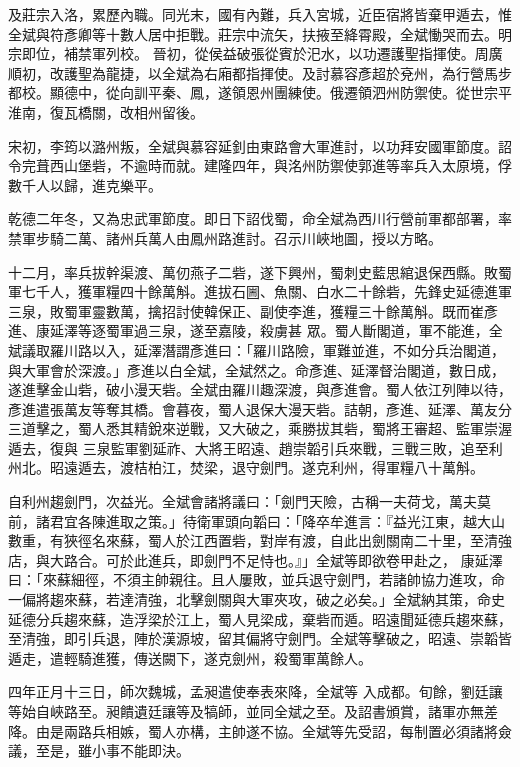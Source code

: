 \begin{pinyinscope}
 及莊宗入洛，累歷內職。同光末，國有內難，兵入宮城，近臣宿將皆棄甲遁去，惟全斌與符彥卿等十數人居中拒戰。莊宗中流矢，扶掖至絳霄殿，全斌慟哭而去。明宗即位，補禁軍列校。
 晉初，從侯益破張從賓於汜水，以功遷護聖指揮使。周廣順初，改護聖為龍捷，以全斌為右廂都指揮使。及討慕容彥超於兗州，為行營馬步都校。顯德中，從向訓平秦、鳳，遂領恩州團練使。俄遷領泗州防禦使。從世宗平淮南，復瓦橋關，改相州留後。



 宋初，李筠以潞州叛，全斌與慕容延釗由東路會大軍進討，以功拜安國軍節度。詔令完葺西山堡砦，不逾時而就。建隆四年，與洺州防禦使郭進等率兵入太原境，俘數千人以歸，進克樂平。



 乾德二年冬，又為忠武軍節度。即日下詔伐蜀，命全斌為西川行營前軍都部署，率禁軍步騎二萬、諸州兵萬人由鳳州路進討。召示川峽地圖，授以方略。



 十二月，率兵拔幹渠渡、萬仞燕子二砦，遂下興州，蜀刺史藍思綰退保西縣。敗蜀軍七千人，獲軍糧四十餘萬斛。進拔石圌、魚關、白水二十餘砦，先鋒史延德進軍三泉，敗蜀軍靈數萬，擒招討使韓保正、副使李進，獲糧三十餘萬斛。既而崔彥進、康延澤等逐蜀軍過三泉，遂至嘉陵，殺虜甚
 眾。蜀人斷閣道，軍不能進，全斌議取羅川路以入，延澤潛謂彥進曰：「羅川路險，軍難並進，不如分兵治閣道，與大軍會於深渡。」彥進以白全斌，全斌然之。命彥進、延澤督治閣道，數日成，遂進擊金山砦，破小漫天砦。全斌由羅川趣深渡，與彥進會。蜀人依江列陣以待，彥進遣張萬友等奪其橋。會暮夜，蜀人退保大漫天砦。詰朝，彥進、延澤、萬友分三道擊之，蜀人悉其精銳來逆戰，又大破之，乘勝拔其砦，蜀將王審超、監軍崇渥遁去，復與
 三泉監軍劉延祚、大將王昭遠、趙崇韜引兵來戰，三戰三敗，追至利州北。昭遠遁去，渡桔柏江，焚梁，退守劍門。遂克利州，得軍糧八十萬斛。



 自利州趨劍門，次益光。全斌會諸將議曰：「劍門天險，古稱一夫荷戈，萬夫莫前，諸君宜各陳進取之策。」待衛軍頭向韜曰：「降卒牟進言：『益光江東，越大山數重，有狹徑名來蘇，蜀人於江西置砦，對岸有渡，自此出劍關南二十里，至清強店，與大路合。可於此進兵，即劍門不足恃也。』」全斌等即欲卷甲赴之，
 康延澤曰：「來蘇細徑，不須主帥親往。且人屢敗，並兵退守劍門，若諸帥協力進攻，命一偏將趨來蘇，若達清強，北擊劍關與大軍夾攻，破之必矣。」全斌納其策，命史延德分兵趨來蘇，造浮梁於江上，蜀人見梁成，棄砦而遁。昭遠聞延德兵趨來蘇，至清強，即引兵退，陣於漢源坡，留其偏將守劍門。全斌等擊破之，昭遠、崇韜皆遁走，遣輕騎進獲，傳送闕下，遂克劍州，殺蜀軍萬餘人。



 四年正月十三日，師次魏城，孟昶遣使奉表來降，全斌等
 入成都。旬餘，劉廷讓等始自峽路至。昶饋遺廷讓等及犒師，並同全斌之至。及詔書頒賞，諸軍亦無差降。由是兩路兵相嫉，蜀人亦構，主帥遂不協。全斌等先受詔，每制置必須諸將僉議，至是，雖小事不能即決。




\end{pinyinscope}
